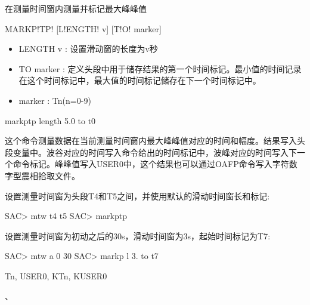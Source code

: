 \label{cmd:markptp}

在测量时间窗内测量并标记最大峰峰值

\begin{SACSTX}
MARKP!TP! [L!ENGTH! v] [T!O! marker]
\end{SACSTX}

\begin{itemize}
\item LENGTH v : 设置滑动窗的长度为v秒 
\item TO marker : 定义头段中用于储存结果的第一个时间标记。最小值的时间记录在这个时间标记中，最大值的时间标记储存在下一个时间标记中。 
\item marker : Tn(n=0-9)
\end{itemize}

\begin{SACDFT}
markptp length 5.0 to t0
\end{SACDFT}

这个命令测量数据在当前测量时间窗内最大峰峰值对应的时间和幅度。结果写入头段变量中。波谷对应的时间写入命令给出的时间标记中，波峰对应的时间写入下一个命令标记。峰峰值写入USER0中，这个结果也可以通过OAFP命令写入字符数字型震相拾取文件。

设置测量时间窗为头段T4和T5之间，并使用默认的滑动时间窗长和标记:
\begin{SACCode}
SAC> mtw t4 t5
SAC> markptp
\end{SACCode}

设置测量时间窗为初动之后的30s，滑动时间窗为3s，起始时间标记为T7:
\begin{SACCode}
SAC> mtw a 0 30
SAC> markp l 3. to t7
\end{SACCode}

Tn, USER0, KTn, KUSER0

、
